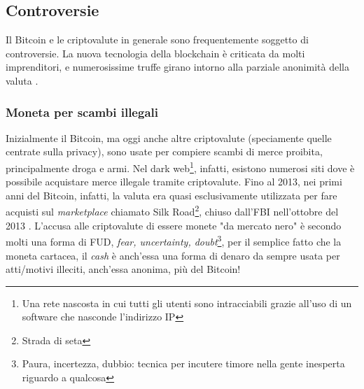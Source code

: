 \documentclass {article}
\begin{document}
%
%

\subsection {Controversie}


Il Bitcoin e le criptovalute in generale sono frequentemente soggetto di controversie. La nuova tecnologia della blockchain è criticata da molti imprenditori, e numerosissime truffe girano intorno alla parziale anonimità della valuta \cite{controversy}.

\subsubsection {Moneta per scambi illegali}

Inizialmente il Bitcoin, ma oggi anche altre criptovalute (speciamente quelle centrate sulla privacy), sono usate per compiere scambi di merce proibita, principalmente droga e armi.
Nel dark web\footnote{Una rete nascosta in cui tutti gli utenti sono intracciabili grazie all'uso di un software che nasconde l'indirizzo IP}, infatti, esistono numerosi siti dove è possibile acquistare merce illegale tramite criptovalute.
Fino al 2013, nei primi anni del Bitcoin, infatti, la valuta era quasi esclusivamente utilizzata per fare acquisti sul \textit{marketplace} chiamato Silk Road\footnote{Strada di seta}, chiuso dall'FBI nell'ottobre del 2013 \cite{silkroad}.
L'accusa alle criptovalute di essere monete "da mercato nero" è secondo molti una forma di FUD, \textit{fear, uncertainty, doubt}\footnote{Paura, incertezza, dubbio: tecnica per incutere timore nella gente inesperta riguardo a qualcosa}, per il semplice fatto che la moneta cartacea, il \textit{cash} è anch'essa una forma di denaro da sempre usata per atti/motivi illeciti, anch'essa anonima, più del Bitcoin! 
\end{document}
